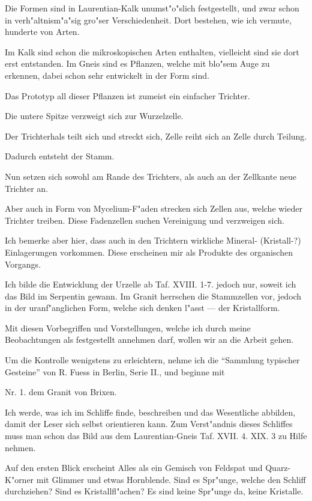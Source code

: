 \documentclass[a4paper, 11pt, oneside, german]{article}
\begin{document}
Die Formen sind in Laurentian-Kalk unumst"o"slich festgestellt, und zwar schon in verh"altnism"a"sig gro"ser Verschiedenheit. Dort bestehen, wie ich vermute, hunderte von Arten.

Im Kalk sind schon die mikroskopischen Arten enthalten, vielleicht sind sie dort erst entstanden. Im Gneis sind es Pflanzen, welche mit blo"sem Auge zu erkennen, dabei schon sehr entwickelt in der Form sind.

Das Prototyp all dieser Pflanzen ist zumeist ein einfacher Trichter.

Die untere Spitze verzweigt sich zur Wurzelzelle.

Der Trichterhals teilt sich und streckt sich, Zelle reiht sich an Zelle durch Teilung.

Dadurch entsteht der Stamm.

Nun setzen sich sowohl am Rande des Trichters, als auch an der Zellkante neue Trichter an.

Aber auch in Form von Mycelium-F"aden strecken sich Zellen aus, welche wieder Trichter treiben. Diese Fadenzellen suchen Vereinigung und verzweigen sich.

Ich bemerke aber hier, dass auch in den Trichtern wirkliche Mineral- (Kristall-?) Einlagerungen vorkommen. Diese erscheinen mir als Produkte des organischen Vorgangs.

Ich bilde die Entwicklung der Urzelle ab Taf. XVIII. 1-7. jedoch nur, soweit ich das Bild im Serpentin gewann. Im Granit herrschen die Stammzellen vor, jedoch in der uranf"anglichen Form, welche sich denken l"asst --- der Kristallform.

Mit diesen Vorbegriffen und Vorstellungen, welche ich durch meine Beobachtungen als festgestellt annehmen darf, wollen wir an die Arbeit gehen.

Um die Kontrolle wenigstens zu erleichtern, nehme ich die "`Sammlung typischer Gesteine"' von R. Fuess in Berlin, Serie II., und beginne mit

Nr. 1. dem Granit von Brixen.

Ich werde, was ich im Schliffe finde, beschreiben und das Wesentliche abbilden, damit der Leser sich selbst orientieren kann. Zum Verst"andnis dieses Schliffes muss man schon das Bild aus dem Laurentian-Gneis Taf. XVII. 4. XIX. 3 zu Hilfe nehmen.

Auf den ersten Blick erscheint Alles als ein Gemisch von Feldspat und Quarz-K"orner mit Glimmer und etwas Hornblende. Sind es Spr"unge, welche den Schliff durchziehen? Sind es Kristallfl"achen? Es sind keine Spr"unge da, keine Kristalle.
\end{document}
